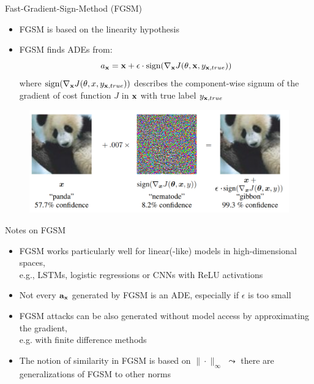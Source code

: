 \documentclass[10pt,compress,t,notes=noshow, xcolor=table]{beamer}
\begin{document}
\begin{vbframe}{Fast-Gradient-Sign-Method (FGSM)
}
\begin{itemize}
    \item FGSM is based on the linearity hypothesis
    \item FGSM finds ADEs from:
    \begin{equation*}
        a_{\mathbf{x}}=\mathbf{x}+\epsilon\cdot\text{sign}(\nabla_{\mathbf{x}} J(\theta,\mathbf{x},y_{\mathbf{x},true}))
    \end{equation*}
    where $\text{sign}(\nabla_{\mathbf{x}} J(\theta,x,y_{\mathbf{x},true}))$ describes the component-wise signum of the gradient of cost function $J$ in $\mathbf{x}$ with true label $y_{\mathbf{x},true}$
\end{itemize}
\begin{figure}[h]
\centering
\includegraphics[width=0.7\linewidth]{figure/AEpanda.png}
  \label{fig:mnist}
\end{figure} 

\end{vbframe}

\begin{vbframe}[c]{Notes on FGSM  }
\begin{itemize}
    \item FGSM works particularly well for linear(-like) models in high-dimensional spaces,\\ e.g., LSTMs, logistic regressions or CNNs with ReLU activations
    \item Not every $\mathbf{a}_{\mathbf{x}}$ generated by FGSM is an ADE, especially if $\epsilon$ is too small
    \item FGSM attacks can be also generated without model access by approximating the gradient,\\ e.g. with finite difference methods
    \item The notion of similarity in FGSM is based on $\|\cdot\|_{\infty}$ $\leadsto$ there are generalizations of FGSM to other norms
\end{itemize}
\end{vbframe}
\end{document}
